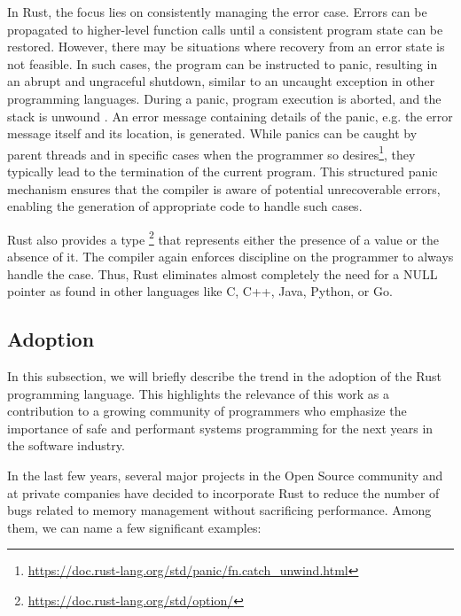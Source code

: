 In Rust, the focus lies on consistently managing the error case.
Errors can be propagated to higher-level function calls
until a consistent program state can be restored.
However, there may be situations where recovery from an error state is not feasible.
In such cases, the program can be instructed to panic,
resulting in an abrupt and ungraceful shutdown,
similar to an uncaught exception in other programming languages.
During a panic, program execution is aborted, and the stack is unwound \cite[Chap. 9.1]{rust-book}.
An error message containing details of the panic,
e.g. the error message itself and its location, is generated.
While panics can be caught by parent threads and
in specific cases when the programmer so desires\footnote{\url{https://doc.rust-lang.org/std/panic/fn.catch\_unwind.html}},
they typically lead to the termination of the current program.
This structured panic mechanism ensures that
the compiler is aware of potential unrecoverable errors,
enabling the generation of appropriate code to handle such cases.

Rust also provides a type \footnote{\url{https://doc.rust-lang.org/std/option/}}
that represents either the presence of a value or the absence of it.
The compiler again enforces discipline on the programmer to always handle the  case.
Thus, Rust eliminates almost completely the need for a NULL pointer
as found in other languages like C, C++, Java, Python, or Go.

\subsection{Adoption}

In this subsection, we will briefly describe the trend
in the adoption of the Rust programming language.
This highlights the relevance of this work
as a contribution to a growing community of programmers
who emphasize the importance of safe and performant systems programming
for the next years in the software industry.

In the last few years, several major projects in the Open Source community and
at private companies have decided to incorporate Rust to reduce the number of bugs
related to memory management without sacrificing performance.
Among them, we can name a few significant examples:

